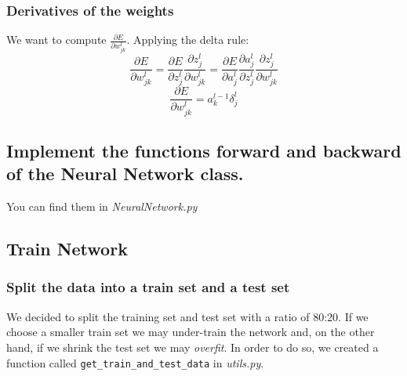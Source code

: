 \documentclass[11pt]{article}
\begin{document}
\subsubsection{Derivatives of the weights}
We want to compute $\frac{\partial E}{\partial w^l_{jk}}$. Applying the delta rule:
\begin{equation}
\frac{\partial E}{\partial w^l_{jk}} = \frac{\partial E}{\partial z^l_j}\frac{\partial z^l_j}{\partial w^l_{jk}} =	
\frac{\partial E}{\partial a^l_j}\frac{\partial a^l_j}{\partial z^l_{j}}
\frac{\partial z^l_j}{\partial w^l_{jk}}
\end{equation}
\begin{equation}
\label{eq:derivativesWeigthDeltas}	
\frac{\partial E}{\partial w^l_{jk}} = a^{l-1}_k \delta^l_j
\end{equation}
\subsection{Implement the functions forward and backward of the Neural Network class.}
You can find them in \emph{NeuralNetwork.py}
\subsection{Train Network}
\subsubsection{ Split the data into a train set and a test set}
We decided to split the training set and test set with a ratio of 80:20. If we choose a smaller train set we may under-train the network and, on the other hand, if we shrink the test set we may \emph{overfit}. In order to do so, we created a function called \texttt{get\_train\_and\_test\_data} in \emph{utils.py}.
\end{document}
